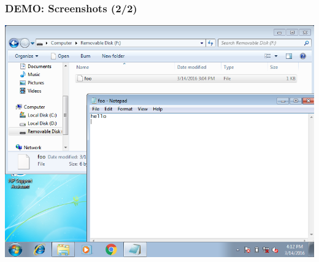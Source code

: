 \begin{frame}

\frametitle{DEMO: Screenshots (2/2)}

\begin{center}

\includegraphics[scale=0.4]{figures/windows-foo}

\end{center}

\end{frame}
